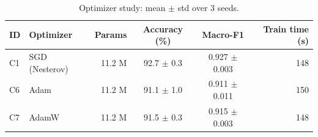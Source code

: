 \begin{table}[t]
\caption{Optimizer study: mean $\pm$ std over 3 seeds.}
\label{tab:optimizer}
\begin{tabular}{llrccr}
\toprule
ID & Optimizer & Params & Accuracy (\%) & Macro-F1 & Train time (s) \\
\midrule
C1 & SGD (Nesterov) & 11.2 M & 92.7 $\pm$ 0.3 & 0.927 $\pm$ 0.003 & 148 \\
C6 & Adam & 11.2 M & 91.1 $\pm$ 1.0 & 0.911 $\pm$ 0.011 & 150 \\
C7 & AdamW & 11.2 M & 91.5 $\pm$ 0.3 & 0.915 $\pm$ 0.003 & 148 \\
\bottomrule
\end{tabular}
\end{table}
